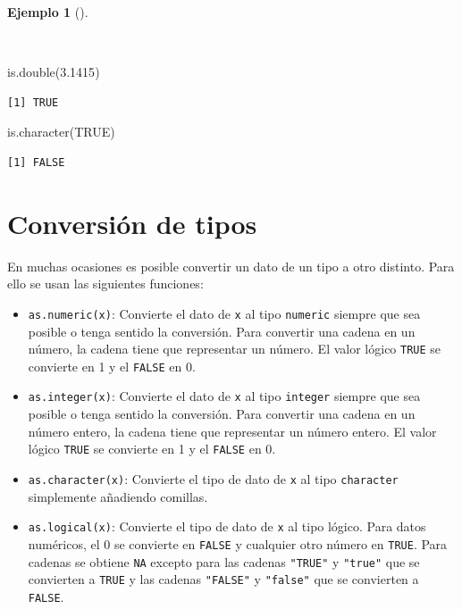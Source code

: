 \documentclass[
  a4paper,
]{scrreport}
\newenvironment{Shaded}{\begin{snugshade}}{\end{snugshade}}
\newcommand{\ConstantTok}[1]{\textcolor[rgb]{0.56,0.35,0.01}{#1}}
\newcommand{\FloatTok}[1]{\textcolor[rgb]{0.68,0.00,0.00}{#1}}
\newcommand{\FunctionTok}[1]{\textcolor[rgb]{0.28,0.35,0.67}{#1}}
\newcommand{\NormalTok}[1]{\textcolor[rgb]{0.00,0.23,0.31}{#1}}
\providecommand{\tightlist}{%
  \setlength{\itemsep}{0pt}\setlength{\parskip}{0pt}}\usepackage{longtable,booktabs,array}
\theoremstyle{definition}
\theoremstyle{definition}
\newtheorem{example}{Ejemplo}[chapter]
\theoremstyle{remark}
\begin{document}
\begin{example}[]\protect\hypertarget{exm-tipos-datos-2}{}\label{exm-tipos-datos-2}

~

\begin{Shaded}
\begin{Highlighting}[]
\FunctionTok{is.double}\NormalTok{(}\FloatTok{3.1415}\NormalTok{)}
\end{Highlighting}
\end{Shaded}

\begin{verbatim}
[1] TRUE
\end{verbatim}

\begin{Shaded}
\begin{Highlighting}[]
\FunctionTok{is.character}\NormalTok{(}\ConstantTok{TRUE}\NormalTok{)}
\end{Highlighting}
\end{Shaded}

\begin{verbatim}
[1] FALSE
\end{verbatim}

\end{example}

\section{Conversión de tipos}\label{conversiuxf3n-de-tipos}

En muchas ocasiones es posible convertir un dato de un tipo a otro
distinto. Para ello se usan las siguientes funciones:

\begin{itemize}
\tightlist
\item
  \texttt{as.numeric(x)}: Convierte el dato de \texttt{x} al tipo
  \texttt{numeric} siempre que sea posible o tenga sentido la
  conversión. Para convertir una cadena en un número, la cadena tiene
  que representar un número. El valor lógico \texttt{TRUE} se convierte
  en 1 y el \texttt{FALSE} en 0.
\item
  \texttt{as.integer(x)}: Convierte el dato de \texttt{x} al tipo
  \texttt{integer} siempre que sea posible o tenga sentido la
  conversión. Para convertir una cadena en un número entero, la cadena
  tiene que representar un número entero. El valor lógico \texttt{TRUE}
  se convierte en 1 y el \texttt{FALSE} en 0.
\item
  \texttt{as.character(x)}: Convierte el tipo de dato de \texttt{x} al
  tipo \texttt{character} simplemente añadiendo comillas.
\item
  \texttt{as.logical(x)}: Convierte el tipo de dato de \texttt{x} al
  tipo lógico. Para datos numéricos, el 0 se convierte en \texttt{FALSE}
  y cualquier otro número en \texttt{TRUE}. Para cadenas se obtiene
  \texttt{NA} excepto para las cadenas \texttt{"TRUE"} y \texttt{"true"}
  que se convierten a \texttt{TRUE} y las cadenas \texttt{"FALSE"} y
  \texttt{"false"} que se convierten a \texttt{FALSE}.
\end{itemize}
\end{document}
